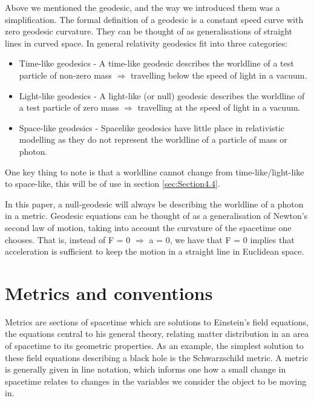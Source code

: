 \documentclass[oneside,openright,frontopenright, singlespacing]{dmathesis}
\begin{document}
\vspace{1em}
	Above we mentioned the geodesic, and the way we introduced them was a simplification. The formal definition of a geodesic is a constant speed curve with zero geodesic curvature. They can be thought of as generalisations of straight lines in curved space. In general relativity geodesics fit into three categories:

\vspace{1em}
\begin{itemize}
  \item Time-like geodesics - A time-like geodesic describes the worldline of a test particle of non-zero mass $\Rightarrow$ travelling below the speed of light in a vacuum.
  \item Light-like geodesics - A light-like (or null) geodesic describes the worldline of a test particle of zero mass $\Rightarrow$ travelling at the speed of light in a vacuum.
  \item Space-like geodesics - Spacelike geodesics have little place in relativistic modelling as they do not represent the worldline of a particle of mass or photon.
\end{itemize}

\vspace{1em}
	One key thing to note is that a worldline cannot change from time-like/light-like to space-like, this will be of use in section \ref{sec:Section4.4}.

\vspace{1em}
	 In this paper, a null-geodesic will always be describing the worldline of a photon in a metric. Geodesic equations can be thought of as a generalisation of Newton's second law of motion, taking into account the curvature of the spacetime one chooses. That is, instead of F = 0 $\Rightarrow$ a = 0, we have that F = 0 implies that acceleration is sufficient to keep the motion in a straight line in Euclidean space.

\section{Metrics and conventions}\label{sec:Section2.3}

\vspace{1em}
	Metrics are sections of spacetime which are solutions to Einstein’s field equations, the equations central to his general theory, relating matter distribution in an area of spacetime to its geometric properties. As an example, the simplest solution to these field equations describing a black hole is the Schwarzschild metric. A metric is generally given in line notation, which informs one how a small change in spacetime relates to changes in the variables we consider the object to be moving in.
\end{document}
